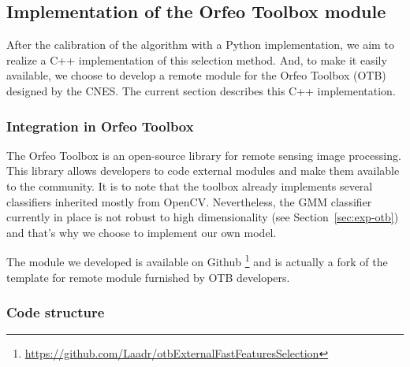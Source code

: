 \documentclass[a4paper,11pt,DIV=16,abstracton]{scrartcl}
\begin{document}
    \subsection{Implementation of the Orfeo Toolbox module}
    \label{sec:otb-implememtation}

    After the calibration of the algorithm with a Python implementation, we aim to realize a C++ implementation of this selection method. And, to make it easily available, we choose to develop a remote module for the Orfeo Toolbox (OTB) designed by the CNES. The current section describes this C++ implementation.

        \subsubsection{Integration in Orfeo Toolbox}

        The Orfeo Toolbox is an open-source library for remote sensing image processing. This library allows developers to code external modules and make them available to the community. It is to note that the toolbox already implements several classifiers inherited mostly from OpenCV. Nevertheless, the GMM classifier currently in place is not robust to high dimensionality (see Section~\ref{sec:exp-otb}) and that's why we choose to implement our own model.

        The module we developed is available on Github \footnote{\url{https://github.com/Laadr/otbExternalFastFeaturesSelection}} and is actually a fork of the template for remote module furnished by OTB developers.

        \subsubsection{Code structure}
\end{document}
